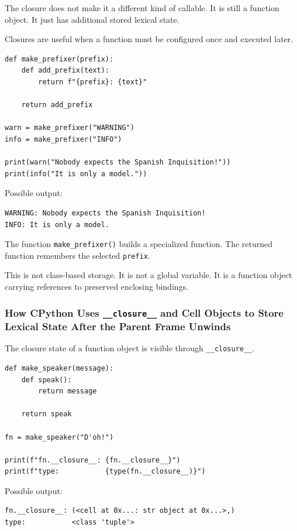 The closure does not make it a different kind of callable. It is still a function object. It just has additional stored lexical state.

Closures are useful when a function must be configured once and executed later.

\begin{verbatim}
def make_prefixer(prefix):
    def add_prefix(text):
        return f"{prefix}: {text}"

    return add_prefix

warn = make_prefixer("WARNING")
info = make_prefixer("INFO")

print(warn("Nobody expects the Spanish Inquisition!"))
print(info("It is only a model."))
\end{verbatim}

Possible output:

\begin{verbatim}
WARNING: Nobody expects the Spanish Inquisition!
INFO: It is only a model.
\end{verbatim}

The function \texttt{make\_prefixer()} builds a specialized function. The returned function remembers the selected \texttt{prefix}.

This is not class-based storage. It is not a global variable. It is a function object carrying references to preserved enclosing bindings.

\subsubsection{How CPython Uses \texttt{\_\_closure\_\_} and Cell Objects to Store Lexical State After the Parent Frame Unwinds}

The closure state of a function object is visible through \texttt{\_\_closure\_\_}.

\begin{verbatim}
def make_speaker(message):
    def speak():
        return message

    return speak

fn = make_speaker("D'oh!")

print(f"fn.__closure__: {fn.__closure__}")
print(f"type:           {type(fn.__closure__)}")
\end{verbatim}

Possible output:

\begin{verbatim}
fn.__closure__: (<cell at 0x...: str object at 0x...>,)
type:           <class 'tuple'>
\end{verbatim}

